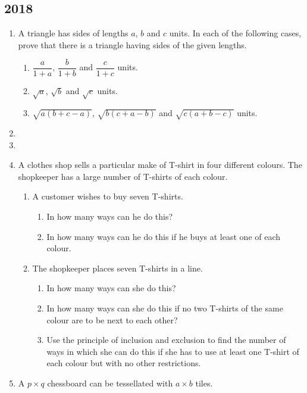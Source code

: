 \subsection*{2018}
\begin{enumerate}
\item A triangle has sides of lengths $a$, $b$ and $c$ units. In each of the following cases, prove that there is a triangle having sides of the given lengths.
\begin{enumerate}[label=(\roman*)]
\item $\dfrac{a}{1+a}$, $\dfrac{b}{1+b}$ and $\dfrac{c}{1+c}$ units.
\item $\sqrt{a}$, $\sqrt{b}$ and $\sqrt{c}$ units.
\item $\sqrt{a(b+c-a)}$, $\sqrt{b(c+a-b)}$ and $\sqrt{c(a+b-c)}$ units.
\end{enumerate}

\item 
\item 
\item A clothes shop sells a particular make of T-shirt in four different colours. The shopkeeper has a large number of T-shirts of each colour.
\begin{enumerate}[label=(\roman*)]
\item A customer wishes to buy seven T-shirts.
\begin{enumerate}[label=(\alph*)]
    \item In how many ways can he do this?
    \item In how many ways can he do this if he buys at least one of each colour.
\end{enumerate}
\item The shopkeeper places seven T-shirts in a line.
\begin{enumerate}[label=(\alph*)]
    \item In how many ways can she do this?
    \item In how many ways can she do this if no two T-shirts of the same colour are to be next to each other?
    \item Use the principle of inclusion and exclusion to find the number of ways in which she can do this if she has to use at least one T-shirt of each colour but with no other restrictions.
\end{enumerate}
\end{enumerate}

\item A $p \times q$ chessboard can be tessellated with $a \times b$ tiles.


\end{enumerate}
